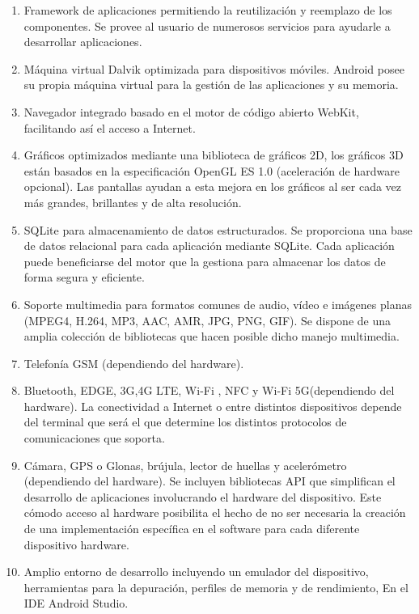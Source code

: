 \documentclass[letterpaper,12pt,openany,oneside]{book}
\begin{document}
\begin{enumerate}

\item Framework de aplicaciones permitiendo la reutilización y reemplazo de los
componentes. Se provee al usuario de numerosos servicios para ayudarle a desarrollar
aplicaciones.
\item Máquina virtual Dalvik optimizada para dispositivos móviles. Android posee su propia
máquina virtual para la gestión de las aplicaciones y su memoria.
\item Navegador integrado basado en el motor de código abierto WebKit, facilitando así el
acceso a Internet.
\item Gráficos optimizados mediante una biblioteca de gráficos 2D, los gráficos 3D están
basados en la especificación OpenGL ES 1.0 (aceleración de hardware opcional). Las
pantallas ayudan a esta mejora en los gráficos al ser cada vez más grandes, brillantes y
de alta resolución.
\item SQLite para almacenamiento de datos estructurados. Se proporciona una base de
datos relacional para cada aplicación mediante SQLite. Cada aplicación puede
beneficiarse del motor que la gestiona para almacenar los datos de forma segura y
eficiente.
\item Soporte multimedia para formatos comunes de audio, vídeo e imágenes planas
(MPEG4, H.264, MP3, AAC, AMR, JPG, PNG, GIF). Se dispone de una amplia colección
de bibliotecas que hacen posible dicho manejo multimedia.
\item Telefonía GSM (dependiendo del hardware).
\item Bluetooth, EDGE, 3G,4G LTE, Wi-Fi , NFC y Wi-Fi 5G(dependiendo del hardware). La conectividad a Internet
o entre distintos dispositivos depende del terminal que será el que determine los
distintos protocolos de comunicaciones que soporta.

\item Cámara, GPS o Glonas, brújula, lector de huellas y acelerómetro (dependiendo del hardware). Se incluyen
bibliotecas API que simplifican el desarrollo de aplicaciones involucrando el hardware
del dispositivo. Este cómodo acceso al hardware posibilita el hecho de no ser necesaria
la creación de una implementación específica en el software para cada diferente
dispositivo hardware.
\item Amplio entorno de desarrollo incluyendo un emulador del dispositivo, herramientas
para la depuración, perfiles de memoria y de rendimiento, En el IDE Android Studio.
\end{enumerate}
\end{document}
